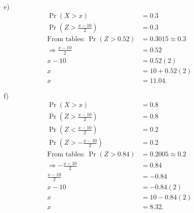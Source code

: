 \documentclass[12pt]{article}
\begin{document}
{\begin{minipage}[t]{0.98\textwidth}
\begin{minipage}[t]{0.47\textwidth}
\end{minipage}\hspace{0.04\textwidth}
\begin{minipage}[t]{0.47\textwidth}
\quad\\[-1cm]
\begin{enumerate}
\item[e)] \quad\\[-1.45cm]
\begin{align*}
\Pr(X > x) &= 0.3 \\
\Pr(Z > \tfrac{x-10}{2}) &= 0.3 \\[0.2cm]
\text{From tables: } \Pr(Z > 0.52) &= 0.3015 \approx 0.3 \\[0.2cm]
\Rightarrow \frac{x-10}{2} &= 0.52 \\
x-10 &= 0.52(2) \\
x &= 10 + 0.52(2) \\
x &= 11.04.
\end{align*}
\item[f)] \quad\\[-1.45cm]
\begin{align*}
\Pr(X > x) &= 0.8 \\
\Pr(Z > \tfrac{x-10}{2}) &= 0.8 \\[0.2cm]
\Pr(Z < \tfrac{x-10}{2}) &= 0.2 \\[0.2cm]
\Pr(Z > -\tfrac{x-10}{2}) &= 0.2 \\[0.2cm]
\text{From tables: } \Pr(Z > 0.84) &= 0.2005 \approx 0.2 \\[0.2cm]
\Rightarrow -\frac{x-10}{2} &= 0.84 \\
\frac{x-10}{2} &= -0.84 \\
x-10 &= -0.84(2) \\
x &= 10 -0.84(2) \\
x &= 8.32.
\end{align*}
\end{enumerate}
\end{minipage}
\end{minipage}}\vspace{0.03\textwidth}
\end{document}
